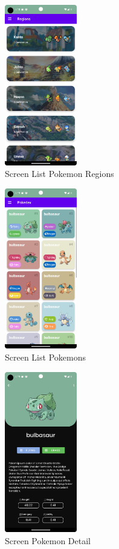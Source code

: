 \documentclass[a4paper, 12pt]{article}
\begin{document}
\begin{figure}[h]
	\centering
	\includegraphics[height=7cm]{imgs/screens/screen_region.png}
	\caption{Screen List Pokemon Regions}
	\label{fig:screen_pokemon_regions}
\end{figure}


\begin{figure}[h]
	\centering
	\includegraphics[height=7cm]{imgs/screens/screen_pokemons.png}
	\caption{Screen List Pokemons}
	\label{fig:screen_pokemons}
\end{figure}


\begin{figure}[h]
	\centering
	\includegraphics[height=7cm]{imgs/screens/screen_pokemon_detail.png}
	\caption{Screen Pokemon Detail}
	\label{fig:screen_pokemon_detail}
\end{figure}
\end{document}
